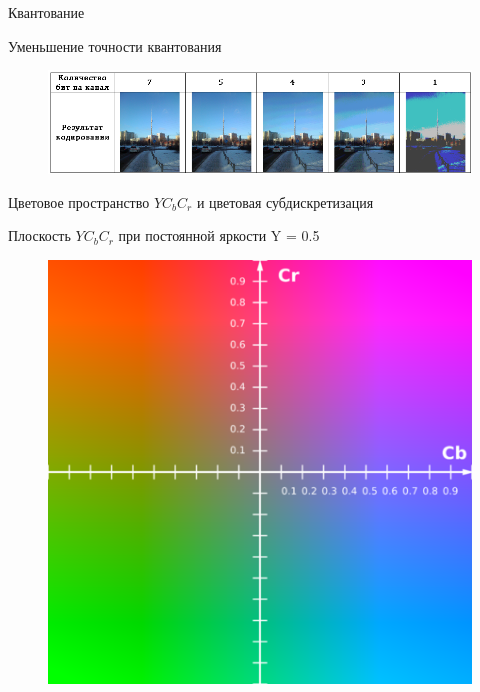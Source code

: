 \documentclass[11pt]{beamer}
\begin{document}
\begin{frame}{Квантование}
\begin{block}{Уменьшение точности квантования}
\begin{figure}[H]
	\begin{center}
		\includegraphics[scale=0.48]{../pics/quantization/quantization.png}
	\end{center}
\end{figure}	
\end{block}				
\end{frame}



\begin{frame}{Цветовое пространство $YC_bC_r$ и цветовая субдискретизация}
\begin{block}{Плоскость $YC_bC_r$ при постоянной яркости Y = 0.5}
\begin{figure}[H]
	\begin{center}
		\includegraphics[scale=0.5]{../pics/YCbCr/YCbCr.png}
	\end{center}
\end{figure}	
\end{block}			
\end{frame}
\end{document}
